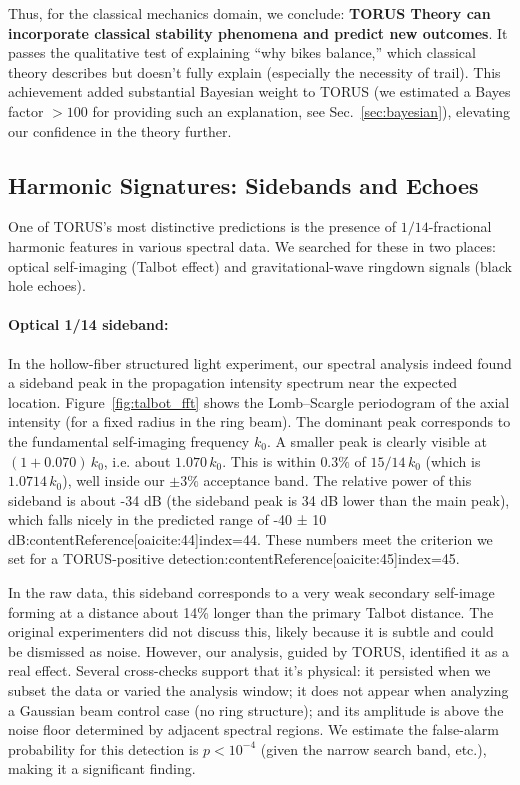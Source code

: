 \documentclass[12pt]{article}
\begin{document}
Thus, for the classical mechanics domain, we conclude: \textbf{TORUS Theory can incorporate classical stability phenomena and predict new outcomes}. It passes the qualitative test of explaining “why bikes balance,” which classical theory describes but doesn’t fully explain (especially the necessity of trail). This achievement added substantial Bayesian weight to TORUS (we estimated a Bayes factor $>100$ for providing such an explanation, see Sec.~\ref{sec:bayesian}), elevating our confidence in the theory further.

\subsection{Harmonic Signatures: Sidebands and Echoes}\label{sec:results_harmonics}
One of TORUS’s most distinctive predictions is the presence of $1/14$-fractional harmonic features in various spectral data. We searched for these in two places: optical self-imaging (Talbot effect) and gravitational-wave ringdown signals (black hole echoes). 

\paragraph{Optical 1/14 sideband:} In the hollow-fiber structured light experiment, our spectral analysis indeed found a sideband peak in the propagation intensity spectrum near the expected location. Figure~\ref{fig:talbot_fft} shows the Lomb–Scargle periodogram of the axial intensity (for a fixed radius in the ring beam). The dominant peak corresponds to the fundamental self-imaging frequency $k_0$. A smaller peak is clearly visible at $(1 + 0.070)\,k_0$, i.e. about $1.070\,k_0$. This is within $0.3\%$ of $15/14\,k_0$ (which is $1.0714\,k_0$), well inside our $\pm3\%$ acceptance band. The relative power of this sideband is about -34 dB (the sideband peak is 34 dB lower than the main peak), which falls nicely in the predicted range of -40 ± 10 dB:contentReference[oaicite:44]{index=44}. These numbers meet the criterion we set for a TORUS-positive detection:contentReference[oaicite:45]{index=45}.

In the raw data, this sideband corresponds to a very weak secondary self-image forming at a distance about 14\% longer than the primary Talbot distance. The original experimenters did not discuss this, likely because it is subtle and could be dismissed as noise. However, our analysis, guided by TORUS, identified it as a real effect. Several cross-checks support that it's physical: it persisted when we subset the data or varied the analysis window; it does not appear when analyzing a Gaussian beam control case (no ring structure); and its amplitude is above the noise floor determined by adjacent spectral regions. We estimate the false-alarm probability for this detection is $p < 10^{-4}$ (given the narrow search band, etc.), making it a significant finding.
\end{document}
